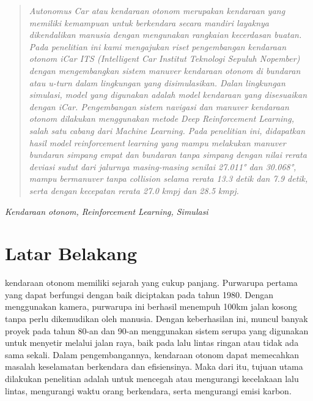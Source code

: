 \documentclass[conference]{IEEEtran}
\begin{document}
	\maketitle
	
	
	\begin{abstract}
		\textit{\textit{Autonomus Car }atau kendaraan otonom merupakan kendaraan yang memiliki kemampuan untuk berkendara secara mandiri layaknya dikendalikan manusia dengan mengunakan rangkaian kecerdasan buatan. Pada penelitian ini kami mengajukan riset pengembangan kendaraan otonom iCar ITS (\textit{Intelligent Car }Institut Teknologi Sepuluh Nopember) dengan mengembangkan sistem manuver kendaraan otonom di bundaran atau u-turn dalam lingkungan yang disimulasikan. Dalan lingkungan simulasi, model yang digunakan adalah model kendaraan yang disesuaikan dengan iCar. Pengembangan sistem navigasi dan manuver kendaraan otonom dilakukan menggunakan metode \textit{Deep Reinforcement Learning}, salah satu cabang dari \textit{Machine Learning}. Pada penelitian ini, didapatkan hasil model reinforcement learning yang mampu melakukan manuver bundaran simpang empat dan bundaran tanpa simpang dengan nilai rerata deviasi sudut dari jalurnya masing-masing senilai 27.011° dan 30.068°, mampu bermanuver tanpa \textit{collision} selama rerata 13.3 detik dan 7.9 detik, serta dengan kecepatan rerata 27.0 kmpj dan 28.5 kmpj.}
	\end{abstract}
	\begin{IEEEkeywords}
		\textit{Kendaraan otonom, Reinforcement Learning, Simulasi}
	\end{IEEEkeywords}
	
	\section{Latar Belakang}
	 kendaraan otonom memiliki sejarah yang cukup panjang. Purwarupa pertama yang dapat berfungsi dengan baik diciptakan pada tahun 1980. Dengan menggunakan kamera, purwarupa ini berhasil menempuh 100km jalan kosong tanpa perlu dikemudikan oleh manusia. Dengan keberhasilan ini, muncul banyak proyek pada tahun 80-an dan 90-an menggunakan sistem serupa yang digunakan untuk menyetir melalui jalan raya, baik pada lalu lintas ringan atau tidak ada sama sekali. Dalam pengembangannya, kendaraan otonom dapat memecahkan masalah keselamatan berkendara dan efisiensinya. Maka dari itu, tujuan utama dilakukan penelitian adalah untuk mencegah atau mengurangi kecelakaan lalu lintas, mengurangi waktu orang berkendara, serta mengurangi emisi karbon.\cite{cit:autonomous_vehicle_future}\par
	
\end{document}
